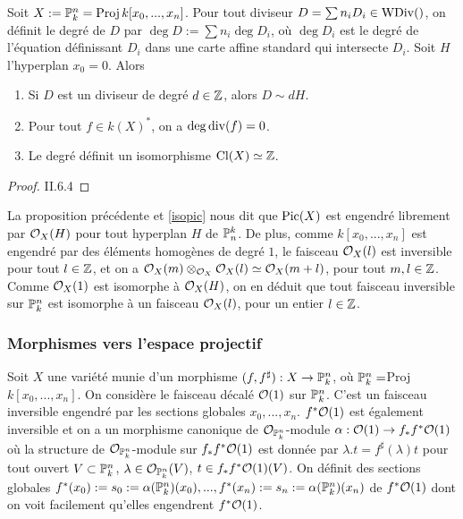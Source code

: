 \begin{prop}
Soit $X:=\mathbb{P}_k^n=\operatorname{Proj} k[x_0,...,x_n]$. Pour tout diviseur $D=\sum n_i D_i\in\operatorname{WDiv}()$, on définit le degré de $D$ par $\deg D:=\sum n_i\deg D_i$, où $\deg D_i$ est le degré de l'équation définissant $D_i$ dans une carte affine standard qui intersecte $D_i$. Soit $H$ l'hyperplan $x_0=0$. Alors
\begin{enumerate}
\item Si $D$ est un diviseur de degré $d\in \mathbb{Z}$, alors $D\sim dH$.
\item Pour tout $f\in k(X)^*$, on a $\deg\operatorname{div}(f)=0$.
\item Le degré définit un isomorphisme $\operatorname{Cl}(X)\simeq \mathbb{Z}$.
\end{enumerate}
\end{prop}
\begin{proof}
\cite{Hartshorne} II.6.4
\end{proof}

La proposition précédente et \ref{isopic} nous dit que $\operatorname{Pic}(X)$ est engendré librement par $\mathcal{O}_X(H)$ pour tout hyperplan $H$ de $\mathbb{P}_n^k$. De plus, comme $k[x_0,...,x_n]$ est engendré par des éléments homogènes de degré $1$, le faisceau $\mathcal{O}_X(l)$ est inversible pour tout $l\in \mathbb{Z}$, et on a $\mathcal{O}_X(m)\otimes_{\mathcal{O}_X}\mathcal{O}_X(l)\simeq \mathcal{O}_X(m+l)$, pour tout $m,l\in \mathbb{Z}$. Comme $\mathcal{O}_X(1)$ est isomorphe à $\mathcal{O}_X(H)$, on en déduit que tout faisceau inversible sur $\mathbb{P}_k^n$ est isomorphe à un faisceau $\mathcal{O}_X(l)$, pour un entier $l\in \mathbb{Z}$.

\subsubsection{Morphismes vers l'espace projectif}
\label{morphismeproj}
Soit $X$ une variété munie d'un morphisme $(f,f^\sharp):X\rightarrow \mathbb{P}^n_k$, où $\mathbb{P}^n_k=$Proj$k[x_0,...,x_n]$. On considère le faisceau décalé $\mathcal{O}(1)$ sur $\mathbb{P}^n_k$. C'est un faisceau inversible engendré par les sections globales $x_0,...,x_n$. $f^*\mathcal{O}(1)$ est également inversible et on a un morphisme canonique de $\mathcal{O}_{\mathbb{P}^n_k}$-module $\alpha:\mathcal{O}(1)\rightarrow f_*f^*\mathcal{O}(1)$ où la structure de $\mathcal{O}_{\mathbb{P}^n_k}$-module sur $f_*f^*\mathcal{O}(1)$ est donnée par $\lambda.t=f^\sharp(\lambda)t$ pour tout ouvert $V\subset \mathbb{P}^n_k$, $\lambda\in \mathcal{O}_{\mathbb{P}^n_k}(V)$, $t\in f_*f^*\mathcal{O}(1)(V)$. On définit des sections globales $f^*(x_0):=s_0:=\alpha(\mathbb{P}^n_k)(x_0),...,f^*(x_n):=s_n:=\alpha(\mathbb{P}^n_k)(x_n)$ de $f^*\mathcal{O}(1)$ dont on voit facilement qu'elles engendrent $f^*\mathcal{O}(1)$.


